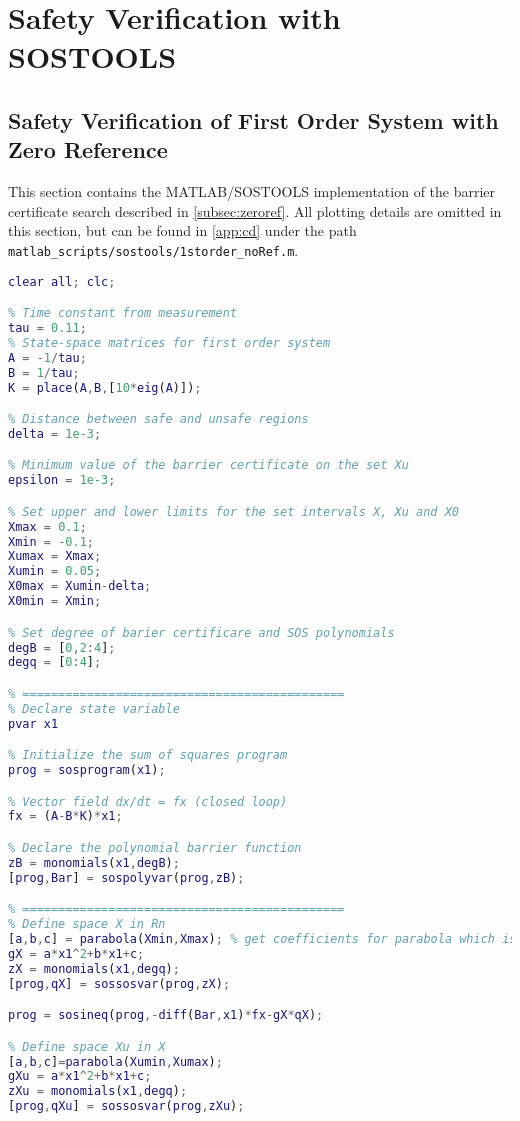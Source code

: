 \section{Safety Verification with SOSTOOLS}
\subsection{Safety Verification of First Order System with Zero Reference}\label{app:sos_noref}
This section contains the MATLAB/SOSTOOLS implementation of the barrier certificate search described in \autoref{subsec:zeroref}. All plotting details are omitted in this section, but can be found in \autoref{app:cd} under the path \texttt{matlab\_scripts/sostools/1storder\_noRef.m}.

\begin{lstlisting}[language=matlab]
% 1D system WITHOUT REFERENCE
clear all; clc; 

% Time constant from measurement
tau = 0.11;
% State-space matrices for first order system
A = -1/tau;
B = 1/tau;
K = place(A,B,[10*eig(A)]);

% Distance between safe and unsafe regions
delta = 1e-3;

% Minimum value of the barrier certificate on the set Xu
epsilon = 1e-3;

% Set upper and lower limits for the set intervals X, Xu and X0
Xmax = 0.1;
Xmin = -0.1;
Xumax = Xmax;
Xumin = 0.05;
X0max = Xumin-delta;
X0min = Xmin;

% Set degree of barier certificare and SOS polynomials
degB = [0,2:4];
degq = [0:4];

% =============================================
% Declare state variable
pvar x1 

% Initialize the sum of squares program
prog = sosprogram(x1);

% Vector field dx/dt = fx (closed loop)
fx = (A-B*K)*x1;

% Declare the polynomial barrier function
zB = monomials(x1,degB);
[prog,Bar] = sospolyvar(prog,zB);

% =============================================
% Define space X in Rn
[a,b,c] = parabola(Xmin,Xmax); % get coefficients for parabola which is positive for x ? [-0.1,0.1]
gX = a*x1^2+b*x1+c;
zX = monomials(x1,degq);
[prog,qX] = sossosvar(prog,zX);

prog = sosineq(prog,-diff(Bar,x1)*fx-gX*qX);

% Define space Xu in X
[a,b,c]=parabola(Xumin,Xumax);
gXu = a*x1^2+b*x1+c;
zXu = monomials(x1,degq);
[prog,qXu] = sossosvar(prog,zXu);


\end{lstlisting}
